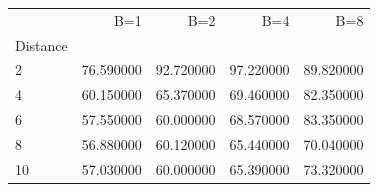 \begin{tabular}{lrrrr}
\toprule
 & B=1 & B=2 & B=4 & B=8 \\
Distance &  &  &  &  \\
\midrule
2 & 76.590000 & 92.720000 & 97.220000 & 89.820000 \\
4 & 60.150000 & 65.370000 & 69.460000 & 82.350000 \\
6 & 57.550000 & 60.000000 & 68.570000 & 83.350000 \\
8 & 56.880000 & 60.120000 & 65.440000 & 70.040000 \\
10 & 57.030000 & 60.000000 & 65.390000 & 73.320000 \\
\bottomrule
\end{tabular}
